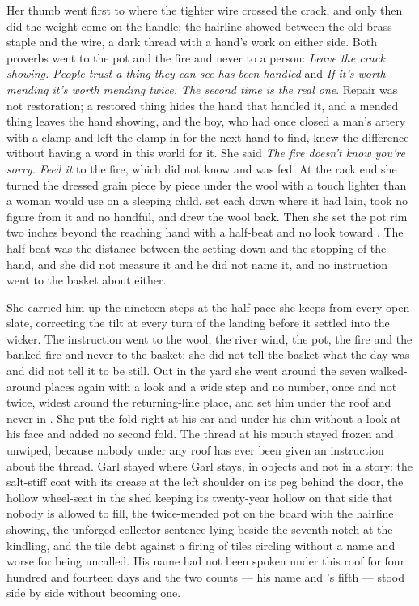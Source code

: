 Her thumb went first to where the tighter wire crossed the crack, and only then did the weight come on the handle; the hairline showed between the old-brass staple and the wire, a dark thread with a hand's work on either side. Both proverbs went to the pot and the fire and never to a person: \emph{Leave the crack showing. People trust a thing they can see has been handled} and \emph{If it's worth mending it's worth mending twice. The second time is the real one}. Repair was not restoration; a restored thing hides the hand that handled it, and a mended thing leaves the hand showing, and the boy, who had once closed a man's artery with a clamp and left the clamp in for the next hand to find, knew the difference without having a word in this world for it. She said \emph{The fire doesn't know you're sorry. Feed it} to the fire, which did not know and was fed. At the rack end she turned the dressed grain piece by piece under the wool with a touch lighter than a woman would use on a sleeping child, set each down where it had lain, took no figure from it and no handful, and drew the wool back. Then she set the pot rim two inches beyond the reaching hand with a half-beat and no look toward . The half-beat was the distance between the setting down and the stopping of the hand, and she did not measure it and he did not name it, and no instruction went to the basket about either.

She carried him up the nineteen steps at the half-pace she keeps from every open slate, correcting the tilt at every turn of the landing before it settled into the wicker. The instruction went to the wool, the river wind, the pot, the fire and the banked fire and never to the basket; she did not tell the basket what the day was and did not tell it to be still. Out in the yard she went around the seven walked-around places again with a look and a wide step and no number, once and not twice, widest around the returning-line place, and set him under the roof and never in . She put the fold right at his ear and under his chin without a look at his face and added no second fold. The thread at his mouth stayed frozen and unwiped, because nobody under any roof has ever been given an instruction about the thread. Garl stayed where Garl stays, in objects and not in a story: the salt-stiff coat with its crease at the left shoulder on its peg behind the door, the hollow wheel-seat in the shed keeping its twenty-year hollow on that side that nobody is allowed to fill, the twice-mended pot on the board with the hairline showing, the unforged collector sentence lying beside the seventh notch at the kindling, and the tile debt against a firing of tiles circling without a name and worse for being uncalled. His name had not been spoken under this roof for four hundred and fourteen days and the two counts --- his name and 's fifth --- stood side by side without becoming one.

